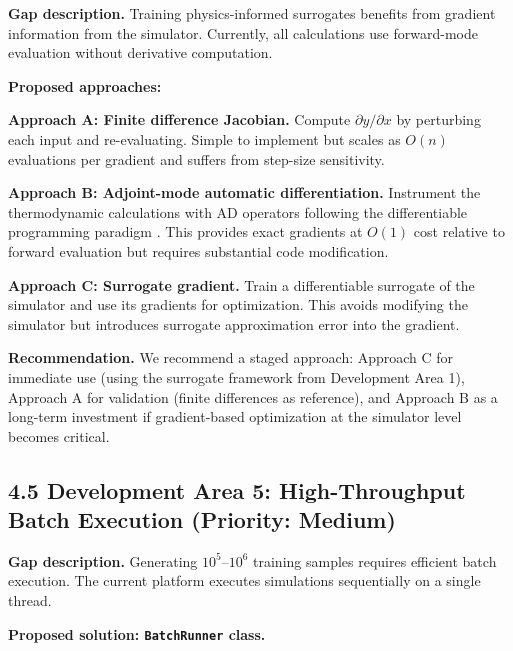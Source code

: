 \documentclass[review,3p]{custom}
\begin{document}
\textbf{Gap description.} Training physics-informed surrogates benefits from gradient information from the simulator. Currently, all calculations use forward-mode evaluation without derivative computation.

\textbf{Proposed approaches:}

\textbf{Approach A: Finite difference Jacobian.} Compute $\partial y / \partial x$ by perturbing each input and re-evaluating. Simple to implement but scales as $O(n)$ evaluations per gradient and suffers from step-size sensitivity.

\textbf{Approach B: Adjoint-mode automatic differentiation.} Instrument the thermodynamic calculations with AD operators following the differentiable programming paradigm \cite{Innes2019, Rackauckas2021}. This provides exact gradients at $O(1)$ cost relative to forward evaluation but requires substantial code modification.

\textbf{Approach C: Surrogate gradient.} Train a differentiable surrogate of the simulator and use its gradients for optimization. This avoids modifying the simulator but introduces surrogate approximation error into the gradient.

\textbf{Recommendation.} We recommend a staged approach: Approach C for immediate use (using the surrogate framework from Development Area 1), Approach A for validation (finite differences as reference), and Approach B as a long-term investment if gradient-based optimization at the simulator level becomes critical.

\subsection{4.5 Development Area 5: High-Throughput Batch Execution (Priority: Medium)}

\textbf{Gap description.} Generating $10^5$--$10^6$ training samples requires efficient batch execution. The current platform executes simulations sequentially on a single thread.

\textbf{Proposed solution: \texttt{BatchRunner} class.}
\end{document}
